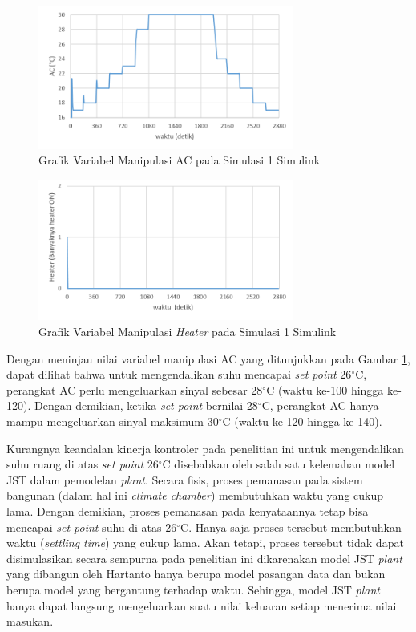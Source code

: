 \begin{figure}[!h]
	\centering
	\includegraphics[width=0.75\textwidth]{figures/Simulink1AC}
	\caption{Grafik Variabel Manipulasi AC pada Simulasi 1 Simulink}
	\label{fig:5:SimulinkAC}
\end{figure}

\begin{figure}[!h]
	\centering
	\includegraphics[width=0.75\textwidth]{figures/Simulink1HT}
	\caption{Grafik Variabel Manipulasi \textit{Heater} pada Simulasi 1 Simulink}
	\label{fig:5:SimulinkHT}
\end{figure}
\vspace{1em}

Dengan meninjau nilai variabel manipulasi AC yang ditunjukkan pada Gambar \ref{fig:5:SimulinkAC}, dapat dilihat bahwa untuk mengendalikan suhu mencapai \textit{set point} 26$^\circ$C, perangkat AC perlu mengeluarkan sinyal sebesar 28$^\circ$C (waktu ke-100 hingga ke-120). Dengan demikian, ketika \textit{set point} bernilai 28$^\circ$C, perangkat AC hanya mampu mengeluarkan sinyal maksimum 30$^\circ$C (waktu ke-120 hingga ke-140).

Kurangnya keandalan kinerja kontroler pada penelitian ini untuk mengendalikan suhu ruang di atas \textit{set point} 26$^\circ$C disebabkan oleh salah satu kelemahan model JST dalam pemodelan \textit{plant}. Secara fisis, proses pemanasan pada sistem bangunan (dalam hal ini \textit{climate chamber}) membutuhkan waktu yang cukup lama. Dengan demikian, proses pemanasan pada kenyataannya tetap bisa mencapai \textit{set point} suhu di atas 26$^\circ$C. Hanya saja proses tersebut membutuhkan waktu (\textit{settling time}) yang cukup lama. Akan tetapi, proses tersebut tidak dapat disimulasikan secara sempurna pada penelitian ini dikarenakan model JST \textit{plant} yang dibangun oleh Hartanto\cite{skripsiTanto} hanya berupa model pasangan data dan bukan berupa model yang bergantung terhadap waktu. Sehingga, model JST \textit{plant} hanya dapat langsung mengeluarkan suatu nilai keluaran setiap menerima nilai masukan.

